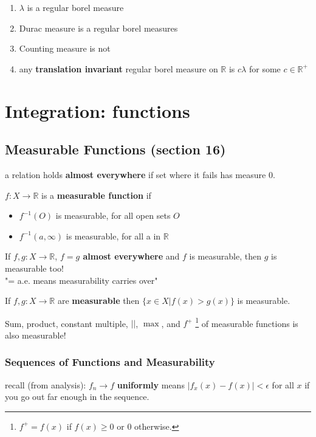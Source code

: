\documentclass[a4paper, 12pt]{article}
\def\R{\ensuremath{\mathbb{R}}} %
\newcommand{\bt}[1]{\textbf{#1}} %
\newcommand{\gray}[1]{{\leavevmode\color[gray]{0.5}{#1}}} %
\begin{document}
\begin{multicols}{2}
\begin{enumerate}
    \item $\lambda$ is a regular borel measure
    \item Durac measure is a regular borel measures
    \item Counting measure is not
    \gray{for example $[0, 1]$ is compact, but has infinite measure}
    \item any \bt{translation invariant} regular borel measure on $\R$ is 
    $c \lambda$ for some $c \in \R^+$
\end{enumerate}

\section{Integration: functions}

\subsection{Measurable Functions (section 16)}

a relation holds \bt{almost everywhere} if set where it fails has measure 0.

$f: X \rightarrow \R$ is a \bt{measurable function} if 
\begin{itemize}
    \item $f^{-1}(O)$ is measurable, for all open sets $O$
    \item $f^{-1}(a, \infty)$ is measurable, for all a in $\R$
\end{itemize}

If $f, g: X \rightarrow \R$,
\bt{$f = g$ almost everywhere}
and $f$ is measurable, then
$g$ is measurable too!\\
"= a.e. means measurability carries over"

If $f, g: X \rightarrow \R$ are \bt{measurable} then $\{x \in X | f(x) > g(x)\}$
is measurable.

Sum, product, constant multiple, $||$, $\max$, and $f^+$ 
\footnote{
$f^+ = f(x)$ if $f(x) \geq 0$ or $0$ otherwise.
}
of 
measurable functions is also measurable!

\subsubsection{Sequences of Functions and Measurability}
recall (from analysis): $f_n \rightarrow f$ \bt{uniformly} means $|f_x(x) - f(x)| < \epsilon$ for all $x$ if you go out far enough in the sequence.


\end{multicols}
\end{document}
